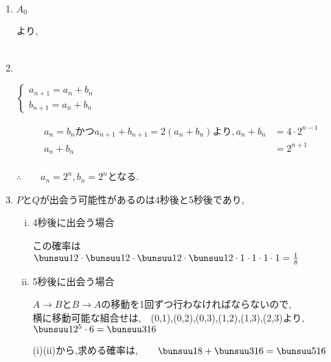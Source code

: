 \begin{enumerate}
  \item $A_0$
  \begin{zyukeizu}
  \end{zyukeizu}%
  より,\\
  \\
  \item　　
  \begin{center}
    $\left\{%
      \begin{array}{l}
        a_{n+1}=a_n+b_n\\
        b_{n+1}=a_n+b_n
      \end{array}
    \right.$
  \end{center}
  \begin{align*}
    a_n=b_n　かつ　a_{n+1}+b_{n+1}=2(a_n+b_n)より,　　a_n+b_n &= 4\cdot2^{n-1}\\
    a_n+b_n &= 2^{n+1}\\
  \end{align*}
  \begin{center}
    $\therefore$　　$a_n=2^n,b_n=2^n$となる.\\
  \end{center}
  \item $P$と$Q$が出会う可能性があるのは4秒後と5秒後であり,
  \begin{enumerate}[(i)\ ]
    \item 4秒後に出会う場合
    \begin{center}
      この確率は$\bunsuu12\cdot\bunsuu12\cdot\bunsuu12\cdot\bunsuu12\cdot 1\cdot 1\cdot 1\cdot 1=\frac18$
    \end{center}
    \item 5秒後に出会う場合
    \begin{center}
      $A\rightarrow BとB\rightarrow A$の移動を1回ずつ行わなければならないので,\\
      横に移動可能な組合せは,　(0,1),(0,2),(0,3),(1,2),(1,3),(2,3)より,　$\bunsuu1{2^{5}}\cdot 6 = \bunsuu3{16}$\\
    \end{center}
  \vspace{30pt}
  (i)(ii)から,求める確率は,　　$\bunsuu18+\bunsuu3{16}=\bunsuu5{16}$
  \end{enumerate}
\end{enumerate}
